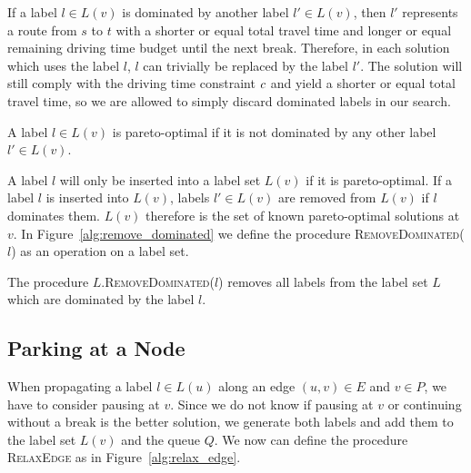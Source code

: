 If a label $l \in L(v)$ is dominated by another label $l' \in L(v)$, then $l'$ represents a route from $s$ to $t$ with a shorter or equal total travel time and longer or equal remaining driving time budget until the next break. Therefore, in each solution which uses the label $l$, $l$ can trivially be replaced by the label $l'$. The solution will still comply with the driving time constraint $c$ and yield a shorter or equal total travel time, so we are allowed to simply discard dominated labels in our search.

\begin{definition}
	A label $l \in L(v)$ is pareto-optimal if it is not dominated by any other label $l' \in L(v)$.
\end{definition}

A label $l$ will only be inserted into a label set $L(v)$ if it is pareto-optimal. If a label $l$ is inserted into $L(v)$, labels $l' \in L(v)$ are removed from $L(v)$ if $l$ dominates them. $L(v)$ therefore is the set of known pareto-optimal solutions at $v$. In Figure~\ref{alg:remove_dominated} we define the procedure \textsc{RemoveDominated($l$)} as an operation on a label set.

\begin{algorithm}[hbtp]
	\DontPrintSemicolon


	\caption[\textsc{RemoveDominated}]{\label{alg:remove_dominated}The procedure $L$.\textsc{RemoveDominated}($l$) removes all labels from the label set $L$ which are dominated by the label $l$.}
\end{algorithm}


\subsection{Parking at a Node}
When propagating a label $l \in L(u)$ along an edge $(u,v) \in E$ and $v \in P$, we have to consider pausing at $v$. Since we do not know if pausing at $v$ or continuing without a break is the better solution, we generate both labels and add them to the label set $L(v)$ and the queue $Q$. We now can define the procedure \textsc{RelaxEdge} as in Figure~\ref{alg:relax_edge}.

